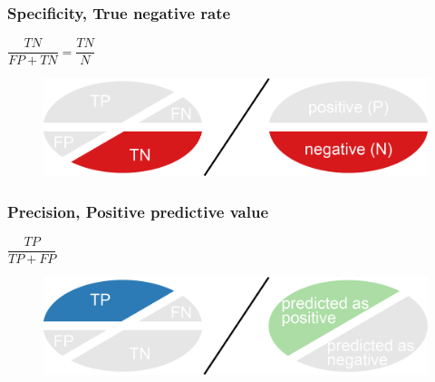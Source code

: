 %
%
\subsubsection*{Specificity, True negative rate}

$\dfrac{TN}{FP+TN}= \dfrac{TN}{N} $

\begin{figure}[H]
  \centering
      \includegraphics[width=0.4 \textwidth]{fig07/specificity.png}
\end{figure}

%
%
\subsubsection*{Precision, Positive predictive value}

$\dfrac{TP}{TP+FP}$

\begin{figure}[H]
  \centering
      \includegraphics[width=0.4 \textwidth]{fig07/precision.png}
\end{figure}

\bigskip 

%
